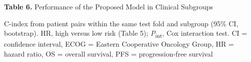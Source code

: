 \documentclass[border=8pt]{standalone}
\newif\ifshowtitle \showtitletrue
\newif\ifshownotes \shownotestrue
\begin{document}
\begin{minipage}{\wd\tablebox}
\ifshowtitle\noindent \textbf{Table 6.} Performance of the Proposed Model in Clinical Subgroups\par\vspace{4pt}\fi
\noindent\usebox\tablebox
\ifshownotes\par\vspace{3pt}\footnotesize\noindent C-index from patient pairs within the same test fold and subgroup (95\% CI, bootstrap). HR, high versus low risk (Table 5); \textit{P}\textsubscript{int}, Cox interaction test. CI = confidence interval, ECOG = Eastern Cooperative Oncology Group, HR = hazard ratio, OS = overall survival, PFS = progression-free survival\par\fi
\end{minipage}
\end{document}
